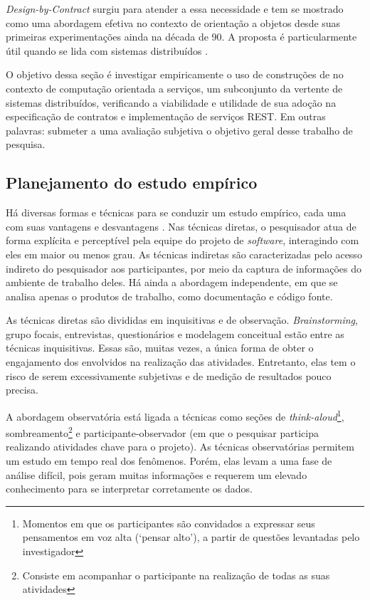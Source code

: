 \textit{Design-by-Contract} surgiu para atender a essa necessidade e tem se
mostrado como uma abordagem efetiva no contexto de orientação a objetos desde
suas primeiras experimentações \cite{jazequel1997design} ainda na década de
90. A proposta é particularmente útil quando se lida com sistemas distribuídos
\cite{arnout2001net}. 

O objetivo dessa seção é investigar empiricamente o uso de construções de
\designbycontract{} no contexto de computação orientada a serviços, um
subconjunto da vertente de sistemas distribuídos, verificando a viabilidade e
utilidade de sua adoção na especificação de contratos e implementação de
serviços REST. Em outras palavras: submeter a uma avaliação subjetiva o objetivo
geral desse trabalho de pesquisa.

\subsection{Planejamento do estudo empírico}

Há diversas formas e técnicas para se conduzir um estudo empírico, cada uma com
suas vantagens e desvantagens \cite{shull2008guide}. Nas técnicas diretas, o pesquisador
atua de forma explícita e perceptível pela equipe do projeto de \textit{software}, interagindo
com eles em maior ou menos grau. As técnicas indiretas são caracterizadas pelo
acesso indireto do pesquisador aos participantes, por meio da captura de
informações do ambiente de trabalho deles. Há ainda a abordagem independente,
em que se analisa apenas o produtos de trabalho, como documentação e código
fonte.

As técnicas diretas são divididas em inquisitivas e de observação.
\textit{Brainstorming}, grupo focais, entrevistas, questionários e modelagem
conceitual estão entre as técnicas inquisitivas. Essas são, muitas vezes, a
única forma de obter o engajamento dos envolvidos na realização das atividades.
Entretanto, elas tem o risco de serem excessivamente subjetivas e de medição de
resultados pouco precisa.

A abordagem observatória está ligada a técnicas como seções de
\textit{think-aloud}\footnote{Momentos em que os participantes são
convidados a expressar seus pensamentos em voz alta (`pensar alto'), a partir de
questões levantadas pelo investigador}, sombreamento\footnote{Consiste
em acompanhar o participante na realização de todas as suas atividades} e
participante-observador (em que o pesquisar participa realizando 
atividades chave para o projeto).
As técnicas observatórias permitem um estudo em tempo real dos fenômenos. Porém, elas levam a uma fase de análise
difícil, pois geram muitas informações e requerem um elevado conhecimento para
se interpretar corretamente os dados.

